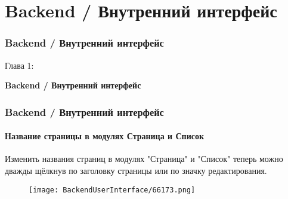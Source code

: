 %

\section{Backend / Внутренний интерфейс}
\begin{frame}[fragile]
	\frametitle{Backend / Внутренний интерфейс}

	\begin{center}\huge{Глава 1:}\end{center}
	\begin{center}\huge{\color{typo3darkgrey}\textbf{Backend / Внутренний интерфейс}}\end{center}

\end{frame}

\begin{frame}[fragile]
	\frametitle{Backend / Внутренний интерфейс}
	\framesubtitle{Название страницы в модулях Страница и Список}

	Изменить названия страниц в модулях "Страница" и "Список" теперь можно дважды щёлкнув
	по заголовку страницы или по значку редактирования.

	\begin{figure}
		\texttt{[image: BackendUserInterface/66173.png]}
	\end{figure}

\end{frame}

